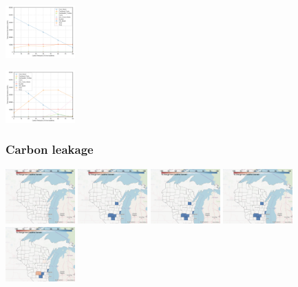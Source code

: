 \documentclass[xcolor=dvipsnames]{beamer}
\begin{document}
\begin{frame}
  \includegraphics[width=0.2\textwidth]{includes/leakage_agg_generation_cntlreg.png}

  \includegraphics[width=0.2\textwidth]{includes/no_leakage_agg_generation_cntlreg.png}

\end{frame}

\begin{frame}
  \frametitle{Carbon leakage}


  \includegraphics[width=0.2\textwidth]{includes/no_leakage_CC_r0.png}
  \includegraphics[width=0.2\textwidth]{includes/no_leakage_CC_r1.png}
  \includegraphics[width=0.2\textwidth]{includes/no_leakage_CC_r2.png}
  \includegraphics[width=0.2\textwidth]{includes/no_leakage_CC_r3.png}
  \includegraphics[width=0.2\textwidth]{includes/no_leakage_CC_r4.png}

\end{frame}
\end{document}
